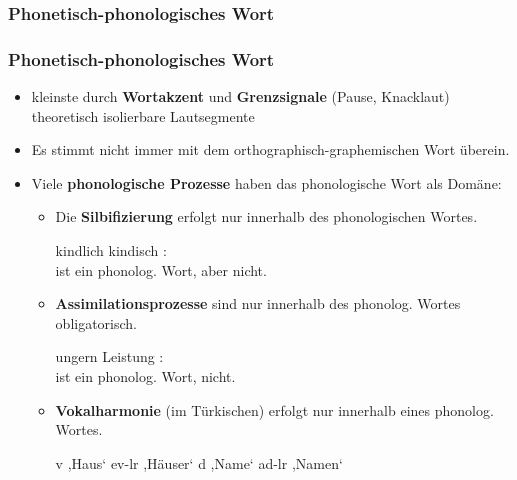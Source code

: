 \subsubsection{Phonetisch-phonologisches Wort}


\begin{frame}
\frametitle{Phonetisch-phonologisches Wort}

\begin{itemize}
	\item kleinste durch \textbf{Wortakzent} und \textbf{Grenzsignale} (Pause, Knacklaut) theoretisch isolierbare Lautsegmente
	\item Es stimmt nicht immer mit dem orthographisch-graphemischen Wort überein.

\pause 
	
	\item Viele \textbf{phonologische Prozesse} haben das phonologische Wort als Domäne:
	
	\begin{itemize}
		\item Die \textbf{Silbifizierung} erfolgt nur innerhalb des phonologischen Wortes.
		
		\ea kindlich  \vs kindisch :\\
		 ist ein phonolog. Wort, aber  nicht.
		\z 

\pause 

		\item \textbf{Assimilationsprozesse} sind nur innerhalb des phonolog. Wortes obligatorisch.
		
		\ea ungern  \vs Leistung \textipa{[l\t{aI}s.tUN]}:\\
		 ist ein phonolog. Wort,  nicht.
		\z 

\pause 
		
		\item \textbf{Vokalharmonie} (\zB im Türkischen) erfolgt nur innerhalb eines phonolog. Wortes.
		
		\eal
		\ex {}v ,Haus` \ras ev-lr ,Häuser`
		\ex {}d ,Name` \ras ad-lr ,Namen`
		\zl
		
	\end{itemize}
\end{itemize}

\end{frame}


